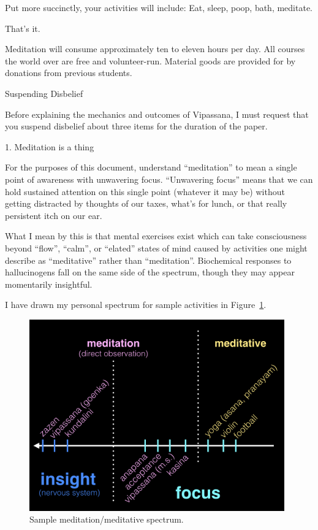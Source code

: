 \documentclass{article}
\begin{document}
Put more succinctly, your activities will include: Eat, sleep, poop, bath, meditate.

That's it.

Meditation will consume approximately ten to eleven hours per day. All courses the world over are free and volunteer-run. Material goods are provided for by donations from previous students.

\pagebreak

\begin{center}
  \Huge{Suspending Disbelief}
\end{center}

Before explaining the mechanics and outcomes of Vipassana, I must request that you suspend disbelief about three items for the duration of the paper.

\vspace{1cm}
\begin{center}
  \LARGE{1. Meditation is a thing}
\end{center}

For the purposes of this document, understand ``meditation'' to mean a single point of awareness with unwavering focus. ``Unwavering focus'' means that we can hold sustained attention on this single point (whatever it may be) without getting distracted by thoughts of our taxes, what's for lunch, or that really persistent itch on our ear.

What I mean by this is that mental exercises exist which can take consciousness beyond ``flow'', ``calm'', or ``elated'' states of mind caused by activities one might describe as ``meditative'' rather than ``meditation''. Biochemical responses to hallucinogens fall on the same side of the spectrum, though they may appear momentarily insightful.

I have drawn my personal spectrum for sample activities in Figure~\ref{fig:meditation-spectrum-1}.

\begin{figure}[H]
  \centering
  \includegraphics[width=11cm]{images/meditation-spectrum-1.jpeg}
  \caption{Sample meditation/meditative spectrum.}
  \label{fig:meditation-spectrum-1}
\end{figure}
\end{document}

